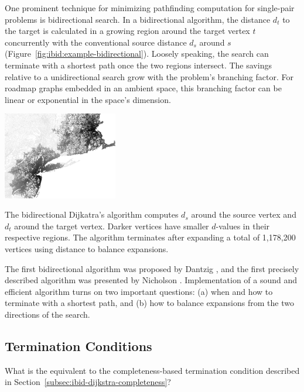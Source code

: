 One prominent technique for minimizing pathfinding computation for
single-pair problems
is bidirectional search.
In a bidirectional algorithm,
the distance $d_t$ to the target is calculated in a growing region
around the target vertex $t$
concurrently with the conventional source distance $d_s$ around $s$
(Figure~\ref{fig:ibid:example-bidirectional}).
Loosely speaking,
the search can terminate with a shortest path
once the two regions intersect.
The savings relative to a unidirectional search grow with the problem's
branching factor.
For roadmap graphs embedded in an ambient space,
this branching factor can be linear or exponential in the space's
dimension.
\begin{marginfigure}%
   \centering%
   \includegraphics[width=5cm]{figs/incbi-road-ne/singleshot/example-bidijkstra.png}%
   \caption{The bidirectional Dijkatra's algorithm
      computes $d_s$ around the source vertex
      and $d_t$ around the target vertex.
      Darker vertices have smaller $d$-values in their respective
      regions.
      The algorithm terminates after expanding a total of
      1,178,200 vertices using distance to balance expansions.}%
   \label{fig:ibid:example-bidirectional}%
\end{marginfigure}

The first bidirectional algorithm
was proposed by Dantzig \citep{dantzig1963linearprogramming},
and the first precisely described algorithm was presented by
Nicholson \citep{nicholson1966shortest}.
Implementation of a sound and efficient algorithm
turns on two important questions:
(a) when and how to terminate with a shortest path,
and (b) how to balance expansions from the two directions of the
search.

\subsection{Termination Conditions}
\label{sec:ibid:bidirectional-termination}

What is the equivalent to the completeness-based termination condition
described in Section~\ref{subsec:ibid-dijkstra-completeness}?

